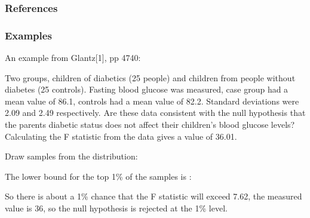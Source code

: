 \documentclass[letterpaper,10pt,english]{sphinxmanual}
\begin{document}
\begin{fulllineitems}
\subsubsection*{References}
\subsubsection*{Examples}

\sphinxAtStartPar
An example from Glantz{[}1{]}, pp 47\sphinxhyphen{}40:

\sphinxAtStartPar
Two groups, children of diabetics (25 people) and children from people
without diabetes (25 controls). Fasting blood glucose was measured,
case group had a mean value of 86.1, controls had a mean value of
82.2. Standard deviations were 2.09 and 2.49 respectively. Are these
data consistent with the null hypothesis that the parents diabetic
status does not affect their children’s blood glucose levels?
Calculating the F statistic from the data gives a value of 36.01.

\sphinxAtStartPar
Draw samples from the distribution:

\begin{sphinxVerbatim}[commandchars=\\\{\}]
   
   
    
\end{sphinxVerbatim}

\sphinxAtStartPar
The lower bound for the top 1\% of the samples is :

\begin{sphinxVerbatim}[commandchars=\\\{\}]
\PYG{p}{[}\PYG{p}{]}
\end{sphinxVerbatim}

\sphinxAtStartPar
So there is about a 1\% chance that the F statistic will exceed 7.62,
the measured value is 36, so the null hypothesis is rejected at the 1\%
level.

\end{fulllineitems}
\end{document}

